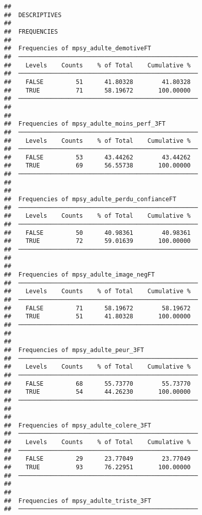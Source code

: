 \documentclass[
]{article}
\begin{document}
\begin{verbatim}
## 
##  DESCRIPTIVES
## 
##  FREQUENCIES
## 
##  Frequencies of mpsy_adulte_demotiveFT              
##  ────────────────────────────────────────────────── 
##    Levels    Counts    % of Total    Cumulative %   
##  ────────────────────────────────────────────────── 
##    FALSE         51      41.80328        41.80328   
##    TRUE          71      58.19672       100.00000   
##  ────────────────────────────────────────────────── 
## 
## 
##  Frequencies of mpsy_adulte_moins_perf_3FT          
##  ────────────────────────────────────────────────── 
##    Levels    Counts    % of Total    Cumulative %   
##  ────────────────────────────────────────────────── 
##    FALSE         53      43.44262        43.44262   
##    TRUE          69      56.55738       100.00000   
##  ────────────────────────────────────────────────── 
## 
## 
##  Frequencies of mpsy_adulte_perdu_confianceFT       
##  ────────────────────────────────────────────────── 
##    Levels    Counts    % of Total    Cumulative %   
##  ────────────────────────────────────────────────── 
##    FALSE         50      40.98361        40.98361   
##    TRUE          72      59.01639       100.00000   
##  ────────────────────────────────────────────────── 
## 
## 
##  Frequencies of mpsy_adulte_image_negFT             
##  ────────────────────────────────────────────────── 
##    Levels    Counts    % of Total    Cumulative %   
##  ────────────────────────────────────────────────── 
##    FALSE         71      58.19672        58.19672   
##    TRUE          51      41.80328       100.00000   
##  ────────────────────────────────────────────────── 
## 
## 
##  Frequencies of mpsy_adulte_peur_3FT                
##  ────────────────────────────────────────────────── 
##    Levels    Counts    % of Total    Cumulative %   
##  ────────────────────────────────────────────────── 
##    FALSE         68      55.73770        55.73770   
##    TRUE          54      44.26230       100.00000   
##  ────────────────────────────────────────────────── 
## 
## 
##  Frequencies of mpsy_adulte_colere_3FT              
##  ────────────────────────────────────────────────── 
##    Levels    Counts    % of Total    Cumulative %   
##  ────────────────────────────────────────────────── 
##    FALSE         29      23.77049        23.77049   
##    TRUE          93      76.22951       100.00000   
##  ────────────────────────────────────────────────── 
## 
## 
##  Frequencies of mpsy_adulte_triste_3FT              
##  ────────────────────────────────────────────────── 

\end{verbatim}
\end{document}
